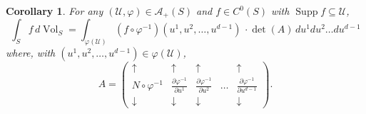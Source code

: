 \documentclass{article}
\newcommand\supp{\operatorname{Supp}}
\renewcommand\det{\operatorname{det}}
\newcommand{\p}{\partial}
\newcommand{\f}[2]{\frac{#1}{#2}}
\theoremstyle{theorem}
\newtheorem{corollary}[theorem]{Corollary}
\newcommand{\Vol}{\operatorname{Vol}}
\begin{document}
\begin{corollary}\label{cor:VolumeFormula}
For any $(\mathcal{U},\varphi)\in\mathcal{A}_+(S)$ and $f\in C^0(S)$ with $\supp{f} \subseteq \mathcal{U}$,
\begin{equation*}
    \int_S f\,d\Vol_S = \int_{\varphi(\mathcal{U})} (f\circ \varphi^{-1})(u^1,u^2,\dots,u^{d-1})\, \cdot {\det{(A)}}\,du^1du^2\dots du^{d-1} 
\end{equation*}
where, with $(u^1,u^2,\dots, u^{d-1}) \in \varphi(\mathcal{U})$, 
\begin{equation*}
    A = 
    \begin{pmatrix}
    \uparrow &\uparrow & \uparrow &   &\uparrow \\ 
    N \circ \varphi^{-1} &\f{\p \varphi^{-1}}{\p u^1}& \f{\p \varphi^{-1}}{\p u^2}  &\dots&\f{\p \varphi^{-1}}{\p u^{d-1}}\\
    \downarrow  &\downarrow  & \downarrow &    &\downarrow 
    \end{pmatrix}.
\end{equation*}
\end{corollary}
\end{document}
